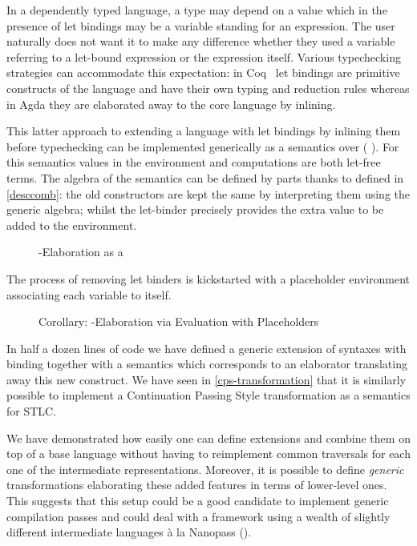 In a dependently typed language, a type may depend on a value which
in the presence of let bindings may be a variable standing for an
expression. The user naturally does not want it to make any difference
whether they used a variable referring to a let-bound expression or
the expression itself. Various typechecking strategies can accommodate
this expectation: in Coq~\cite{Coq:manual} let bindings are primitive
constructs of the language and have their own typing and reduction
rules whereas in Agda they are elaborated away to the core language
by inlining.

This latter approach to extending a language  with let bindings
by inlining them before typechecking can be implemented generically as
a semantics over (  ). For this semantics values
in the environment and computations are both let-free terms. The algebra
of the semantics can be defined by parts thanks to  defined in
\cref{desccomb}: the old constructors are kept the same by interpreting
them using the generic  algebra;
whilst the let-binder precisely provides the extra value to be added to the
environment.

\begin{figure}[h]
\caption{-Elaboration as a }
\end{figure}

The process of removing let binders is kickstarted with a placeholder
environment associating each variable to itself.

\begin{figure}[h]
\caption{Corollary: -Elaboration via Evaluation with Placeholders}
\end{figure}

In half a dozen lines of code we have defined a generic extension of syntaxes with
binding together with a semantics which corresponds to an elaborator translating
away this new construct. We have seen in \cref{cps-transformation} that it is
similarly possible to implement a Continuation Passing Style transformation as
a semantics for STLC.

We have demonstrated how easily one can define extensions and combine them on top
of a base language without having to reimplement common traversals for each one
of the intermediate representations. Moreover, it is possible to define
\emph{generic} transformations elaborating these added features in terms of
lower-level ones. This suggests that this setup could be a good candidate to
implement generic compilation passes and could deal with a framework using a
wealth of slightly different intermediate languages à la Nanopass (\cite{Keep:2013:NFC:2544174.2500618}).


